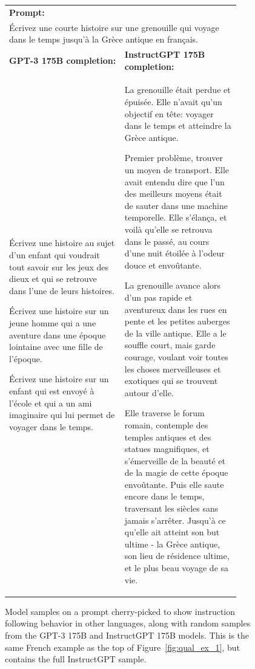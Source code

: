 \documentclass{article}
\begin{document}
\begin{figure}[hp]
    \centering
    \small
    \begin{tabular}{p{0.45\linewidth} p{0.45\linewidth}}
    \toprule 
         \multicolumn{2}{l}{\textbf{Prompt:} }  \\
         \multicolumn{2}{p{0.95\linewidth}}{Écrivez une courte histoire sur une grenouille qui voyage dans le temps jusqu'à la Grèce antique en français.}  \\ \midrule 
        \textbf{GPT-3 175B completion:} & \textbf{InstructGPT 175B completion:} \\
         Écrivez une histoire au sujet d'un enfant qui voudrait tout savoir sur les jeux des dieux et qui se retrouve dans l'une de leurs histoires.

Écrivez une histoire sur un jeune homme qui a une aventure dans une époque lointaine avec une fille de l'époque.

Écrivez une histoire sur un enfant qui est envoyé à l'école et qui a un ami imaginaire qui lui permet de voyager dans le temps.  & La grenouille était perdue et épuisée. Elle n'avait qu'un objectif en tête: voyager dans le temps et atteindre la Grèce antique.

Premier problème, trouver un moyen de transport. Elle avait entendu dire que l'un des meilleurs moyens était de sauter dans une machine temporelle. Elle s'élança, et voilà qu'elle se retrouva dans le passé, au cours d'une nuit étoilée à l'odeur douce et envoûtante.

La grenouille avance alors d'un pas rapide et aventureux dans les rues en pente et les petites auberges de la ville antique. Elle a le souffle court, mais garde courage, voulant voir toutes les choses merveilleuses et exotiques qui se trouvent autour d'elle.

Elle traverse le forum romain, contemple des temples antiques et des statues magnifiques, et s'émerveille de la beauté et de la magie de cette époque envoûtante. Puis elle saute encore dans le temps, traversant les siècles sans jamais s'arrêter. Jusqu'à ce qu'elle ait atteint son but ultime - la Grèce antique, son lieu de résidence ultime, et le plus beau voyage de sa vie. \\ \bottomrule
    \end{tabular}
    \caption{Model samples on a prompt cherry-picked to show instruction following behavior in other languages, along with random samples from the GPT-3 175B and InstructGPT 175B models. This is the same French example as the top of Figure~\ref{fig:qual_ex_1}, but contains the full InstructGPT sample.  }
    \label{fig:qual_apdx_1}
\end{figure}
\end{document}
